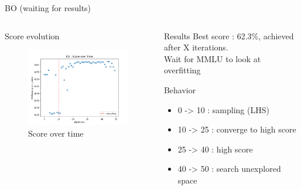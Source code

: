 \begin{frame}[allowframebreaks]{BO (waiting for results)}
    
    \begin{columns}
    
        \begin{column}{0.6\textwidth}
            \begin{block}{Score evolution}
                \begin{figure}
                    \centering
                    \includegraphics[width = 7.5cm]{imgs/plots/exp12_score_over_time.png}
                    \caption{Score over time}
                \end{figure}
            
            \end{block}   
        \end{column}

        \begin{column}{0.4\textwidth}
            \begin{block}{Results}
                Best score : 62.3\%, achieved after X iterations. \\   
                Wait for MMLU to look at overfitting            
            \end{block}

            \begin{block}{Behavior}
                \begin{itemize}
                    \item 0 -> 10 : sampling (LHS)
                    \item 10 -> 25 : converge to high score
                    \item 25 -> 40 : high score
                    \item 40 -> 50 : search unexplored space
                \end{itemize}
                

\end{block}
\end{column}
\end{columns}
\end{frame}
